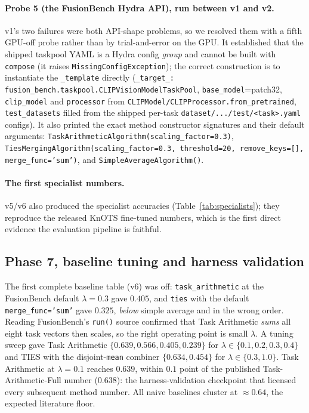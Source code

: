 \documentclass[11pt]{article}
\begin{document}
\paragraph{Probe 5 (the FusionBench Hydra API), run between v1 and v2.}
v1's two failures were both API-shape problems, so we resolved them with a fifth GPU-off probe rather than
by trial-and-error on the GPU. It established that the shipped taskpool YAML is a Hydra config
\emph{group} and cannot be built with \texttt{compose} (it raises \texttt{MissingConfigException}); the
correct construction is to instantiate the \texttt{\_template} directly (\texttt{\_target\_:
fusion\_bench.taskpool.CLIPVisionModelTaskPool}, \texttt{base\_model}=patch32, \texttt{clip\_model} and
\texttt{processor} from \texttt{CLIPModel/CLIPProcessor.from\_pretrained}, \texttt{test\_datasets} filled
from the shipped per-task \texttt{dataset/.../test/<task>.yaml} configs). It also printed the exact method
constructor signatures and their default arguments: \texttt{TaskArithmeticAlgorithm(scaling\_factor=0.3)},
\texttt{TiesMergingAlgorithm(scaling\_factor=0.3, threshold=20, remove\_keys=[], merge\_func='sum')}, and
\texttt{SimpleAverageAlgorithm()}.

\paragraph{The first specialist numbers.} v5/v6 also produced the specialist accuracies
(Table~\ref{tab:specialists}); they reproduce the released KnOTS fine-tuned numbers, which is the first
direct evidence the evaluation pipeline is faithful.

\subsection{Phase 7, baseline tuning and harness validation}
\label{app:tuning}
The first complete baseline table (v6) was off: \texttt{task\_arithmetic} at the FusionBench default
$\lambda=0.3$ gave $0.405$, and \texttt{ties} with the default \texttt{merge\_func='sum'} gave $0.325$,
\emph{below} simple average and in the wrong order. Reading FusionBench's \texttt{run()} source confirmed
that Task Arithmetic \emph{sums} all eight task vectors then scales, so the right operating point is small
$\lambda$. A tuning sweep gave Task Arithmetic $\{0.639, 0.566, 0.405, 0.239\}$ for
$\lambda\in\{0.1,0.2,0.3,0.4\}$ and TIES with the disjoint-\texttt{mean} combiner $\{0.634, 0.454\}$ for
$\lambda\in\{0.3,1.0\}$. Task Arithmetic at $\lambda=0.1$ reaches $0.639$, within $0.1$ point of the
published Task-Arithmetic-Full number ($0.638$): the harness-validation checkpoint that licensed every
subsequent method number. All naive baselines cluster at $\approx 0.64$, the expected literature floor.
\end{document}
